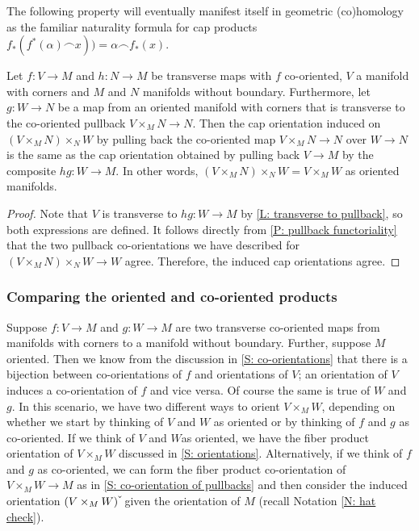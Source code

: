 The following property will eventually manifest itself in geometric (co)homology as the familiar naturality formula for cap products $f_*(f^*(\alpha)\frown x)) = \alpha\frown f_*(x)$.

\begin{proposition}\label{P: natural cap}
	Let $f \colon V \to M$ and $h \colon N \to M$ be transverse maps with $f$ co-oriented, $V$ a manifold with corners and $M$ and $N$ manifolds without boundary.
	Furthermore, let $g \colon W \to N$ be a map from an oriented manifold with corners that is transverse to the co-oriented pullback $V \times_M N \to N$.
	Then the cap orientation induced on $(V \times_M N) \times_N W$ by pulling back the co-oriented map $V \times_M N \to N$ over $W \to N$
	is the same as the cap orientation obtained by pulling back $V \to M$ by the composite $hg \colon W \to M$.
	In other words, $(V \times_M N) \times_N W = V \times_M W$ as oriented manifolds.
\end{proposition}

\begin{proof}
	Note that $V$ is transverse to $hg \colon W \to M$ by \cref{L: transverse to pullback}, so both expressions are defined.
	It follows directly from \cref{P: pullback functoriality} that the two pullback co-orientations we have described for $(V \times_M N) \times_N W \to W$ agree.
	Therefore, the induced cap orientations agree.
\end{proof}

\subsubsection{Comparing the oriented and co-oriented products}\label{S: c vs o}

Suppose $f \colon V \to M$ and $g \colon W \to M$ are two transverse co-oriented maps from manifolds with corners to a manifold without boundary.
Further, suppose $M$ oriented.
Then we know from the discussion in \cref{S: co-orientations} that there is a bijection between co-orientations of $f$ and orientations of $V$; an orientation of $V$ induces a co-orientation of $f$ and vice versa.
Of course the same is true of $W$ and $g$.
In this scenario, we have two different ways to orient $V \times_M W$, depending on whether we start by thinking of $V$ and $W$ as oriented or by thinking of $f$ and $g$ as co-oriented.
If we think of $V$ and $W $as oriented, we have the fiber product orientation of $V \times_M W$
discussed in \cref{S: orientations}.
Alternatively, if we think of $f$ and $g$ as co-oriented, we can form the fiber product co-orientation of $V \times_M W \to M$ as in \cref{S: co-orientation of pullbacks} and then consider the induced orientation $(V \times_M W)\,\check{\vrule height1.3ex width0pt}$ given the orientation of $M$ (recall Notation \ref{N: hat check}).

